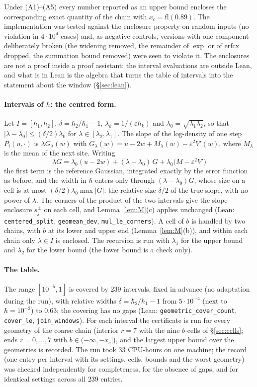 \documentclass[11pt,a4paper]{article}
\theoremstyle{definition}
\theoremstyle{remark}
\newcommand{\xc}{x_c}
\newcommand{\code}[1]{\texttt{#1}}
\begin{document}
Under (A1)--(A5) every number reported as an upper bound encloses the corresponding exact quantity of the chain with $\xc=\mathrm{fl}(0.89)$. The implementation was tested against the enclosure property on random inputs (no violation in $4\cdot10^4$ cases) and, as negative controls, versions with one component deliberately broken (the widening removed, the remainder of $\exp$ or of $\mathrm{erfcx}$ dropped, the summation bound removed) were seen to violate it. The enclosures are not a proof inside a proof assistant: the interval evaluations are outside Lean, and what is in Lean is the algebra that turns the table of intervals into the statement about the window (\S\ref{sec:lean}).

\paragraph{Intervals of $\hbar$: the centred form.} Let $I=[\hbar_1,\hbar_2]$, $\delta=\hbar_2/\hbar_1-1$, $\lambda_k=1/(\varepsilon\hbar_k)$ and $\lambda_0=\sqrt{\lambda_1\lambda_2}$, so that $|\lambda-\lambda_0|\le(\delta/2)\lambda_0$ for $\lambda\in[\lambda_2,\lambda_1]$. The slope of the log-density of one step $P_i(u,\cdot)$ is $\lambda G_\lambda(w)$ with $G_\lambda(w)=u-2w+M_\lambda(w)-\varepsilon^2V'(w)$, where $M_\lambda$ is the mean of the next site. Writing
\[
\lambda G=\lambda_0(u-2w)+(\lambda-\lambda_0)\,G+\lambda_0\big(M-\varepsilon^2V'\big)
\]
the first term is the reference Gaussian, integrated exactly by the error function as before, and the width in $\hbar$ enters only through $(\lambda-\lambda_0)G$, whose size on a cell is at most $(\delta/2)\lambda_0\max|G|$: the relative size $\delta/2$ of the true slope, with no power of $\lambda$. The corners of the product of the two intervals give the slope enclosure $s_j^\pm$ on each cell, and Lemma~\ref{lem:M}(c) applies unchanged (Lean: \code{centered\_split}, \code{geomean\_dev}, \code{mul\_le\_corners}). A cell of $b$ is handled by two chains, with $b$ at its lower and upper end (Lemma~\ref{lem:M}(b)), and within each chain only $\lambda\in I$ is enclosed. The recursion is run with $\lambda_1$ for the upper bound and $\lambda_2$ for the lower bound (the lower bound is a check only).

\paragraph{The table.} The range $[10^{-5},1]$ is covered by $239$ intervals, fixed in advance (no adaptation during the run), with relative widths $\delta=\hbar_2/\hbar_1-1$ from $5\cdot10^{-4}$ (next to $\hbar=10^{-2}$) to $0.63$; the covering has no gaps (Lean: \code{geometric\_cover\_count}, \code{cover\_le}, \code{join\_windows}). For each interval the certificate is run for every geometry of the coarse chain (interior $r=7$ with the nine $b$-cells of \S\ref{sec:cells}; ends $r=0,\dots,7$ with $b\in(-\infty,-\xc]$), and the largest upper bound over the geometries is recorded. The run took $33$ CPU-hours on one machine; the record (one entry per interval with its settings, cells, bounds and the worst geometry) was checked independently for completeness, for the absence of gaps, and for identical settings across all $239$ entries.
\end{document}
